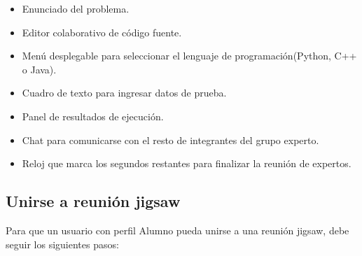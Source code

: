 \begin{enumerate}
	\begin{itemize}
		\item Enunciado del problema.
		\item Editor colaborativo de código fuente.
		\item Menú desplegable para seleccionar el lenguaje de programación(Python, C++ o Java).
		\item Cuadro de texto para ingresar datos de prueba.
		\item Panel de resultados de ejecución.
		\item Chat para comunicarse con el resto de integrantes del grupo experto.
		\item Reloj que marca los segundos restantes para finalizar la reunión de expertos.
	\end{itemize}
\end{enumerate}


\subsection{Unirse a reunión jigsaw}
Para que un usuario con perfil Alumno pueda unirse a una reunión jigsaw, debe seguir los siguientes pasos:

